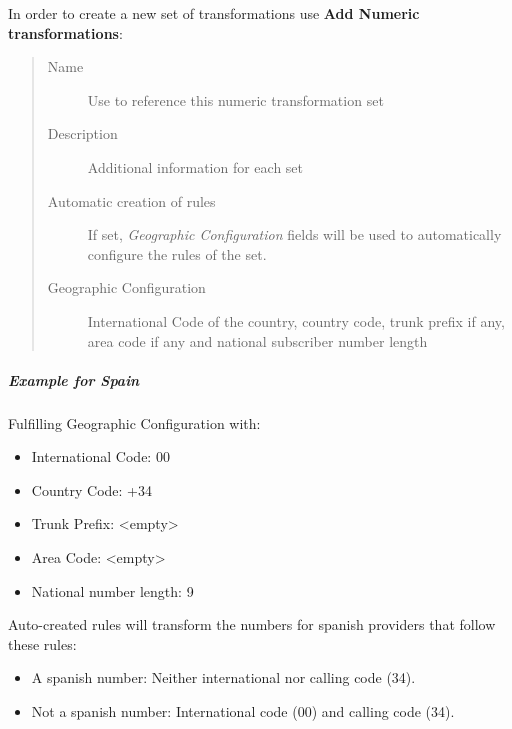 \documentclass[letterpaper,10pt,english]{sphinxmanual}
\begin{document}
In order to create a new set of transformations use \textbf{Add Numeric transformations}:
\begin{quote}
\begin{description}
\item[{Name}] \leavevmode
Use to reference this numeric transformation set

\item[{Description}] \leavevmode
Additional information for each set

\item[{Automatic creation of rules}] \leavevmode
If set, \emph{Geographic Configuration} fields will be used to automatically configure the rules of the set.

\item[{Geographic Configuration}] \leavevmode
International Code of the country, country code, trunk prefix if any, area code if any and national subscriber
number length

\end{description}
\end{quote}


\subparagraph{Example for Spain}
\label{administration_portal/brand/settings/numeric_transformations:example-for-spain}
Fulfilling Geographic Configuration with:
\begin{itemize}
\item {} 
International Code: 00

\item {} 
Country Code: +34

\item {} 
Trunk Prefix: \textless{}empty\textgreater{}

\item {} 
Area Code: \textless{}empty\textgreater{}

\item {} 
National number length: 9

\end{itemize}

Auto-created rules will transform the numbers for spanish providers that follow these rules:
\begin{itemize}
\item {} 
A spanish number: Neither international nor calling code (34).

\item {} 
Not a spanish number: International code (00) and calling code (34).

\end{itemize}
\end{document}
